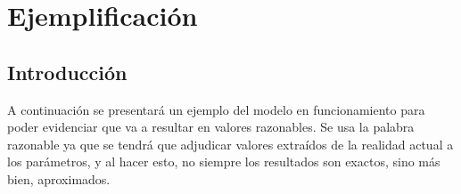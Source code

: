 \documentclass[12pt]{report}
\begin{document}
\section*{Ejemplificaci\'on}

\subsection*{Introducci\'on}
A continuaci\'on se presentar\'a un ejemplo del modelo en funcionamiento para poder evidenciar que va a resultar en valores razonables. Se usa la palabra razonable ya que se tendr\'a que adjudicar valores extra\'idos de la realidad actual a los par\'ametros, y al hacer esto, no siempre los resultados son exactos, sino m\'as bien, aproximados.

\end{document}
